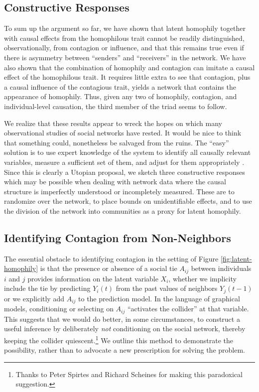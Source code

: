 \documentclass{article}
\begin{document}
\begin{multicols}{2}
\section{Constructive Responses}
\label{sec:positives}

To sum up the argument so far, we have shown that latent homophily together
with causal effects from the homophilous trait cannot be readily distinguished,
observationally, from contagion or influence, and that this remains true even
if there is asymmetry between ``senders'' and ``receivers'' in the network.  We
have also shown that the combination of homophily and contagion can imitate a
causal effect of the homophilous trait.  It requires little extra to see that
contagion, plus a causal influence of the contagious trait, yields a network
that contains the appearance of homophily.  Thus, given any two of homophily,
contagion, and individual-level causation, the third member of the triad seems
to follow.

We realize that these results appear to wreck the hopes on which many
observational studies of social networks have rested.  It would be nice to
think that something could, nonetheless be salvaged from the ruins.  The
``easy'' solution is to use expert knowledge of the system to identify all
causally relevant variables, measure a sufficient set of them, and adjust for
them appropriately
\citep{Morgan-Winship-counterfactuals,Pearl-causality,Spirtes-Glymour-Scheines}.
Since this is clearly a Utopian proposal, we sketch three constructive
responses which may be possible when dealing with network data where the causal
structure is imperfectly understood or incompletely measured.  These are to
randomize over the network, to place bounds on unidentifiable effects, and to
use the division of the network into communities as a proxy for latent
homophily.



\subsection{Identifying Contagion from Non-Neighbors}
\label{sec:contagion-from-non-neighbors}

The essential obstacle to identifying contagion in the setting of Figure
\ref{fig:latent-homophily} is that the presence or absence of a social tie
$A_{ij}$ between individuals $i$ and $j$ provides information on the latent
variable $X_i$, whether we implicity include the tie by predicting $Y_i(t)$
from the past values of neighbors $Y_{j}(t-1)$ or we explicitly add $A_{ij}$ to
the prediction model.  In the language of graphical models, conditioning or
selecting on $A_{ij}$ ``activates the collider'' at that variable. This
suggests that we would do better, in some circumstances, to construct a useful
inference by deliberately {\em not} conditioning on the social network, thereby
keeping the collider quiescent.\footnote{Thanks to Peter Spirtes and Richard
  Scheines for making this paradoxical suggestion.}  We outline this method to
demonstrate the possibility, rather than to advocate a new prescription for
solving the problem.


\end{multicols}
\end{document}
